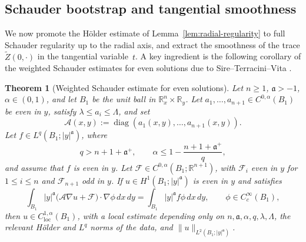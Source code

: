 \documentclass[11pt]{amsart}
\newtheorem{theorem}{Theorem}[section]
\newcommand{\R}{\mathbb R}
\newcommand{\dd}{\,d}
\newcommand{\loc}{\mathrm{loc}}
\begin{document}
\subsection{Schauder bootstrap and tangential smoothness}

We now promote the H\"older estimate of Lemma~\ref{lem:radial-regularity}
to full Schauder regularity up to the radial axis, and extract the
smoothness of the trace \(\widetilde Z(0,\cdot)\) in the tangential variable~\(t\).
A key ingredient is the following corollary of the weighted Schauder estimates for
even solutions due to Sire--Terracini--Vita
\cite[Thms.~1.2 and 1.3]{STV2021}.

\begin{theorem}[Weighted Schauder estimate for even solutions]
\label{thm:stv-even-schauder}
Let \(n\ge1\), \(\mathfrak a>-1\), \(\alpha\in(0,1)\), and let \(B_1\) be
the unit ball in \(\R^n_x\times\R_y\). Let
\(a_1,\ldots,a_{n+1}\in C^{0,\alpha}(B_1)\) be even in \(y\), satisfy
\(\lambda\le a_i\le\Lambda\), and set
\[
        \mathcal A(x,y):=\operatorname{diag}
        (a_1(x,y),\ldots,a_{n+1}(x,y)).
\]
Let \(f\in L^q(B_1;|y|^{\mathfrak a})\), where
\begin{equation}
\label{eq:stv-q-condition}
        q>n+1+\mathfrak a^+,\qquad
        \alpha\le1-\frac{n+1+\mathfrak a^+}{q},
\end{equation}
and assume that \(f\) is even in \(y\). Let
\(\mathcal F\in C^{0,\alpha}(B_1;\R^{n+1})\), with
\(\mathcal F_i\) even in \(y\) for \(1\le i\le n\) and
\(\mathcal F_{n+1}\) odd in \(y\). If \(u\in H^1(B_1;|y|^{\mathfrak a})\)
is even in \(y\) and satisfies
\begin{equation}
\label{eq:stv-whole-weak}
        \int_{B_1}|y|^{\mathfrak a}
        \bigl(\mathcal A\nabla u+\mathcal F\bigr)\cdot\nabla\phi\dd x\dd y
        =\int_{B_1}|y|^{\mathfrak a}f\phi\dd x\dd y,
        \qquad \phi\in C_c^\infty(B_1),
\end{equation}
then \(u\in C^{1,\alpha}_{\loc}(B_1)\), with a local estimate depending only
on \(n,\mathfrak a,\alpha,q,\lambda,\Lambda\), the relevant H\"older and
\(L^q\) norms of the data, and
\(\|u\|_{L^2(B_1;|y|^{\mathfrak a})}\).
\end{theorem}
\end{document}
